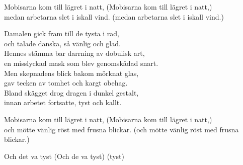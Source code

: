 \begin{lyrics}
Mobisarna kom till lägret i natt,
(Mobisarna kom till lägret i natt,)\\
medan arbetarna slet i iskall vind.
(medan arbetarna slet i iskall vind.)

Damalen gick fram till de tysta i rad,\\
och talade danska, så vänlig och glad.\\
Hennes stämma bar darrning av dobulisk art,\\
en misslyckad mask som blev genomskådad snart.\\
Men skepnadens blick bakom mörknat glas,\\
gav tecken av tomhet och kargt obehag.\\
Bland skägget drog dragen i dunkel gestalt,\\
innan arbetet fortsatte, tyst och kallt.

Mobisarna kom till lägret i natt,
(Mobisarna kom till lägret i natt,)\\
och mötte vänlig röst med frusna blickar.
(och mötte vänlig röst med frusna blickar.)

Och det va tyst
(Och de va tyst)
(tyst)
\end{lyrics}


